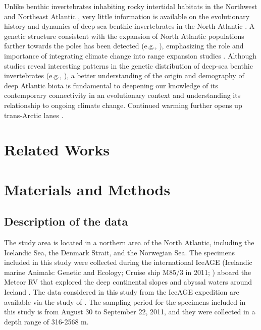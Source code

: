 Unlike benthic invertebrates inhabiting rocky intertidal habitats in the Northwest and Northeast Atlantic \citep{wares2002community, maggs2008evaluating, ilves2010colonization}, very little information is available on the evolutionary history and dynamics of deep-sea benthic invertebrates in the North Atlantic \citep{etter2011phylogeography}. A genetic structure consistent with the expansion of North Atlantic populations farther towards the poles has been detected (e.g., \citep{aarbakke2011discovery}), emphasizing the role and importance of integrating climate change into range expansion studies \citep{jennings2014phylogeographic}. Although studies reveal interesting patterns in the genetic distribution of deep-sea benthic invertebrates (e.g., \citep{havermans2013genetic, wilson1998historical}), a better understanding of the origin and demography of deep Atlantic biota is fundamental to deepening our knowledge of its contemporary connectivity in an evolutionary context and understanding its relationship to ongoing climate change. Continued warming further opens up trans-Arctic lanes \citep{jennings2014phylogeographic}.

\section{Related Works}\label{related-works}

\section{Materials and Methods}\label{materials-methods}

\subsection{Description of the data}
The study area is located in a northern area of the North Atlantic, including the Icelandic Sea, the Denmark Strait, and the Norwegian Sea. The specimens included in this study were collected during the international IceAGE (Icelandic marine Animals: Genetic and Ecology; Cruise ship M85/3 in 2011; \citep{brix2014iceage, meissner2018preface}) aboard the Meteor RV that explored the deep continental slopes and abyssal waters around Iceland \citep{meissner2018preface}. The data considered in this study from the IceAGE expedition are available via the study of \cite{uhlir2021adding}. The sampling period for the specimens included in this study is from August 30 to September 22, 2011, and they were collected in a depth range of 316-2568 m.

